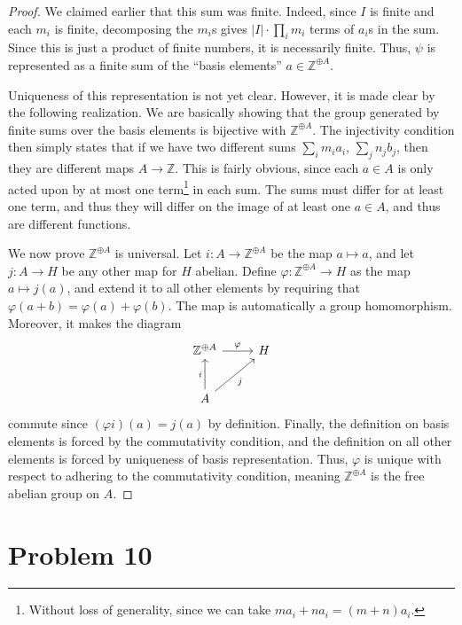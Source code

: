 \documentclass[11pt, letterpaper]{article}
\theoremstyle{plain}
\begin{document}
\begin{proof}
	We claimed earlier that this sum was finite. Indeed, since $I$ is finite and each $m_i$ is finite, decomposing the $m_i$s gives $\left| I \right| \cdot \prod_{i} m_i$ terms of $a_i$s in the sum. Since this is just a product of finite numbers, it is necessarily finite. Thus, $\psi $ is represented as a finite sum of the ``basis elements'' $a\in \mathbb{Z} ^{\oplus A} $.

	Uniqueness of this representation is not yet clear. However, it is made clear by the following realization. We are basically showing that the group generated by finite sums over the basis elements is bijective with $\mathbb{Z} ^{\oplus A} $. The injectivity condition then simply states that if we have two different sums $\sum_{i} m_ia_i$, $\sum_{j} n_jb_j$, then they are different maps $A\to \mathbb{Z} $. This is fairly obvious, since each $a\in A$ is only acted upon by at most one term\footnote{Without loss of generality, since we can take $ma_i+na_i=(m+n)a_i$.} in each sum. The sums must differ for at least one term, and thus they will differ on the image of at least one $a\in A$, and thus are different functions.

	We now prove $\mathbb{Z} ^{\oplus A} $ is universal. Let $i : A \to \mathbb{Z} ^{\oplus A} $ be the map $a\mapsto a$, and let $j : A \to H$ be any other map for $H$ abelian. Define $\varphi : \mathbb{Z} ^{\oplus A}  \to H$ as the map $a\mapsto j(a)$, and extend it to all other elements by requiring that $\varphi (a+b)=\varphi (a)+\varphi (b)$. The map is automatically a group homomorphism. Moreover, it makes the diagram
	\[\begin{tikzcd}[row sep = 2.5em, column sep = 2.5em]
	\mathbb{Z} ^{\oplus A} \ar[" \varphi  ", r]  & H \\
	A \ar[" i ", u] \ar[" j "', ur]  & 
	\end{tikzcd}\]
	commute since $(\varphi i)(a)=j(a)$ by definition. Finally, the definition on basis elements is forced by the commutativity condition, and the definition on all other elements is forced by uniqueness of basis representation. Thus, $\varphi $ is unique with respect to adhering to the commutativity condition, meaning $\mathbb{Z} ^{\oplus A} $ is the free abelian group on $A$.
\end{proof}

\section{Problem 10}
\end{document}
